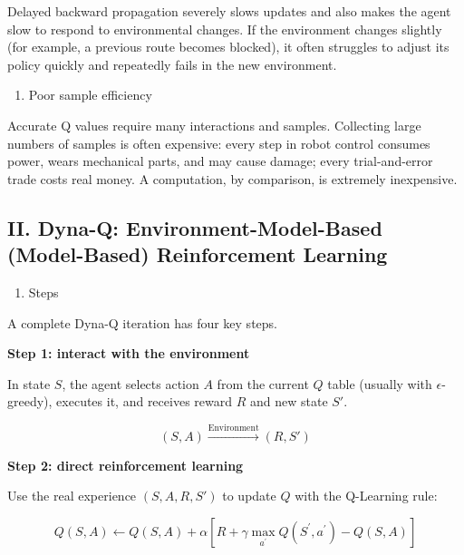 Delayed backward propagation severely slows updates and also makes the agent slow to respond to environmental changes. If the environment changes slightly (for example, a previous route becomes blocked), it often struggles to adjust its policy quickly and repeatedly fails in the new environment.

\begin{enumerate}
\def\labelenumi{\arabic{enumi}.}
\setcounter{enumi}{1}
\tightlist
\item
  Poor sample efficiency
\end{enumerate}

Accurate Q values require many interactions and samples. Collecting large numbers of samples is often expensive: every step in robot control consumes power, wears mechanical parts, and may cause damage; every trial-and-error trade costs real money. A computation, by comparison, is extremely inexpensive.

\hypertarget{ii.-dyna-q-environment-model-based-model-based-reinforcement-learning}{%
\subsection{II. Dyna-Q: Environment-Model-Based (Model-Based) Reinforcement Learning}\label{ii.-dyna-q-environment-model-based-model-based-reinforcement-learning}}

\begin{enumerate}
\def\labelenumi{\arabic{enumi}.}
\tightlist
\item
  Steps
\end{enumerate}

A complete Dyna-Q iteration has four key steps.

\textbf{Step 1: interact with the environment}

In state \(S\), the agent selects action \(A\) from the current \(Q\) table (usually with \(\epsilon\)-greedy), executes it, and receives reward \(R\) and new state \(S'\).

\[
(S,A)\xrightarrow{\text{Environment}}(R,S')
\]

\textbf{Step 2: direct reinforcement learning}

Use the real experience \((S,A,R,S')\) to update \(Q\) with the Q-Learning rule:

\[
Q(S,A)\leftarrow Q(S,A)+\alpha[R+\gamma\max_{a^{\prime}}Q(S^{\prime},a^{\prime})-Q(S,A)]
\]

